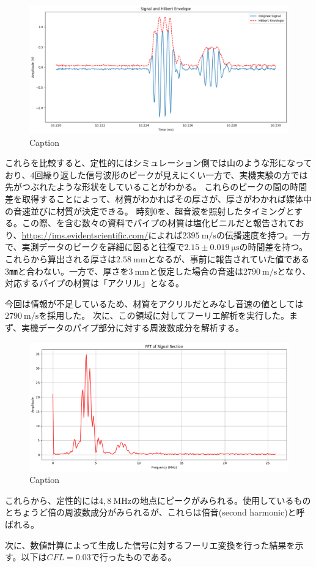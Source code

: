 \documentclass[uplatex]{suribt}
\begin{document}
\begin{figure}[htbp]
    \centering
    \includegraphics[width=0.5\linewidth]{pictures/results/pipe_refrection_real.png}
    \caption{Caption}
    \label{fig:pipe_reflection_real}
\end{figure}
これらを比較すると、定性的にはシミュレーション側では山のような形になっており、4回繰り返した信号波形のピークが見えにくい一方で、実機実験の方では先がつぶれたような形状をしていることがわかる。
これらのピークの間の時間差を取得することによって、材質がわかればその厚さが、厚さがわかれば媒体中の音速並びに材質が決定できる。
時刻0を、超音波を照射したタイミングとする。この際、\cite{塩ビ2021}を含む数々の資料でパイプの材質は塩化ビニルだと報告されており、\url{https://ims.evidentscientific.com/}によれば$2395\ \mathrm{m/s}$の伝播速度を持つ。一方で、実測データのピークを詳細に図ると往復で$2.15 \pm 0.019\ \mathrm{\mu s}$の時間差を持つ。これらから算出される厚さは$2.58\ \mathrm{mm}$となるが、事前に報告されていた値である3㎜と合わない。一方で、厚さを$3\ \mathrm{mm}$と仮定した場合の音速は$2790\ \mathrm{m/s}$となり、対応するパイプの材質は「アクリル」となる。\par
今回は情報が不足しているため、材質をアクリルだとみなし音速の値としては$2790\ \mathrm{m/s}$を採用した。
次に、この領域に対してフーリエ解析を実行した。まず、実機データのパイプ部分に対する周波数成分を解析する。
\begin{figure}[htbp]
    \centering
    \includegraphics[width=0.5\linewidth]{pictures/explanation/Fourier_analysis_real.png}
    \caption{Caption}
    \label{fig:fourier_analysis_real}
\end{figure}
これらから、定性的には$4,8\ \mathrm{MHz}$の地点にピークがみられる。使用しているものとちょうど倍の周波数成分がみられるが、これらは倍音(second harmonic)と呼ばれる。\par
次に、数値計算によって生成した信号に対するフーリエ変換を行った結果を示す。以下は$CFL=0.03$で行ったものである。
\end{document}
